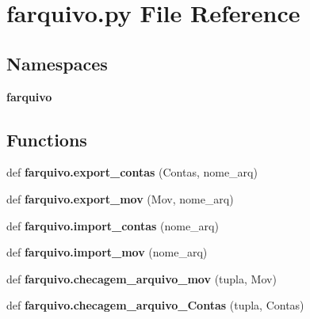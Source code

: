 \section{farquivo.\+py File Reference}
\label{farquivo_8py}
\subsection*{Namespaces}
\begin{DoxyCompactItemize}
\item 
 \textbf{ farquivo}
\end{DoxyCompactItemize}
\subsection*{Functions}
\begin{DoxyCompactItemize}
\item 
def \textbf{ farquivo.\+export\+\_\+contas} (Contas, nome\+\_\+arq)
\item 
def \textbf{ farquivo.\+export\+\_\+mov} (Mov, nome\+\_\+arq)
\item 
def \textbf{ farquivo.\+import\+\_\+contas} (nome\+\_\+arq)
\item 
def \textbf{ farquivo.\+import\+\_\+mov} (nome\+\_\+arq)
\item 
def \textbf{ farquivo.\+checagem\+\_\+arquivo\+\_\+mov} (tupla, Mov)
\item 
def \textbf{ farquivo.\+checagem\+\_\+arquivo\+\_\+\+Contas} (tupla, Contas)
\end{DoxyCompactItemize}

